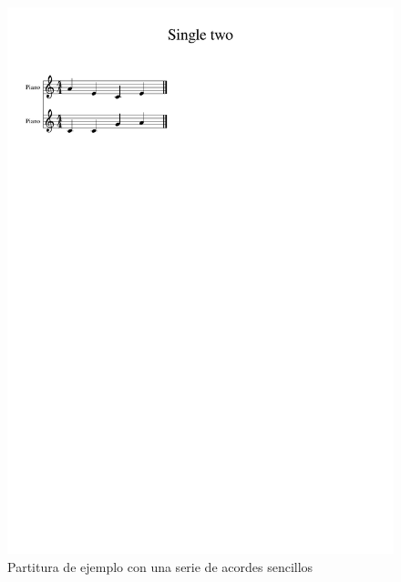      \begin{figure}
     	\centering
     	\includegraphics[width=0.8\linewidth]{imagenes/scores/simple_chords.pdf}
     	\caption{Partitura de ejemplo con una serie de acordes sencillos}
     	\label{fig:simplechords_score}
     \end{figure}

